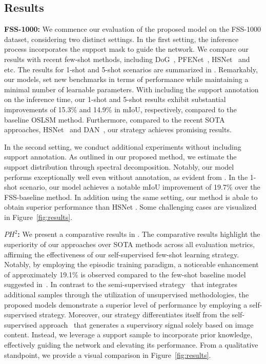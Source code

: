 \documentclass[runningheads]{llncs}
\begin{document}
\subsection{Results}
\textbf{FSS-1000:} We commence our evaluation of the proposed model on the FSS-1000 dataset, considering two distinct settings. In the first setting, the inference process incorporates the support mask to guide the network. We compare our results with recent few-shot methods, including 
DoG~\cite{azad2021texture}, PFENet~\cite{tian2020prior}, HSNet~\cite{min2021hypercorrelation} and etc. The results for 1-shot and 5-shot scenarios are summarized in . Remarkably, our models, set new benchmarks in terms of performance while maintaining a minimal number of learnable parameters. With including the support annotation on the inference time, our 1-shot and 5-shot results exhibit substantial improvements of 15.3\% and 14.9\% in mIoU, respectively, compared to the baseline OSLSM method. Furthermore, compared to the recent SOTA approaches, HSNet~\cite{min2021hypercorrelation} and DAN~\cite{wang2020few}, our strategy achieves promising results.


In the second setting, we conduct additional experiments without including support annotation. As outlined in our proposed method, we estimate the support distribution through spectral decomposition. Notably, our model performs exceptionally well even without annotation, as evident from . In the 1-shot scenario, our model achieves a notable mIoU improvement of 19.7\% over the FSS-baseline method. In addition using the same setting, our method is abale to obtain superior performance than HSNet \cite{min2021hypercorrelation}. Some challenging cases are visualized in Figure~\ref{fig:results}.




\noindent\textbf{$PH^2$:} We present a comparative results in . The comparative results highlight the superiority of our approaches over SOTA methods across all evaluation metrics, affirming the effectiveness of our self-supervised few-shot learning strategy. 
Notably, by employing the episodic training paradigm, a noticeable enhancement of approximately 19.1\% is observed compared to the few-shot baseline model suggested in~\cite{feyjie2020semi}. In contrast to the semi-supervised strategy~\cite{feyjie2020semi} that integrates additional samples through the utilization of unsupervised methodologies, the proposed models demonstrate a superior level of performance by employing a self-supervised strategy.
Moreover, our strategy differentiates itself from the self-supervised approach~\cite{ahn2021spatial,karimijafarbigloo2023ms} that generates a supervisory signal solely based on image content. Instead, we leverage a support sample to incorporate prior knowledge, effectively guiding the network and elevating its performance.
From a qualitative standpoint, we provide a visual comparison in Figure~\ref{fig:results}. 
\end{document}
